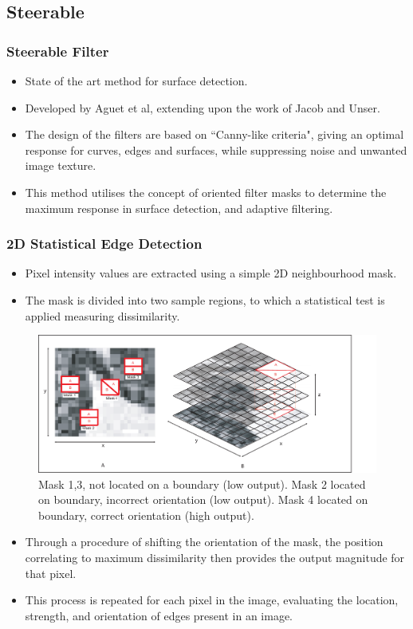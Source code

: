 \documentclass[9pt]{beamer}
\begin{document}
\subsection{Steerable}
\begin{frame}
\frametitle {Steerable Filter}
\begin{itemize}

\item State of the art method for surface detection.
\item Developed by Aguet et al, extending upon the work of Jacob and Unser.
\item The design of the filters are based on ``Canny-like criteria", giving an optimal response for curves, edges and surfaces, while suppressing noise and unwanted image texture.
\item This method utilises the concept of oriented filter masks to determine the maximum response in surface detection, and adaptive filtering.
\end{itemize}
\end{frame}
\begin{frame}[shrink]
\frametitle{ 2D Statistical Edge Detection}
\begin{multicols}{2}
\begin{itemize}
\item Pixel intensity values are extracted using a simple 2D neighbourhood mask. 
\item The mask is divided into two sample regions, to which a statistical test is applied measuring dissimilarity.
 \end{itemize}
 \begin{figure}
\includegraphics[scale=0.35]{2D3Dmasks1}
\caption{ Mask 1,3, not located on a boundary (low output). Mask 2 located on boundary, incorrect orientation (low output). Mask 4 located on boundary, correct orientation (high output).}
 \end{figure}
 \begin{itemize}
 \item Through a procedure of shifting the orientation of the mask, the position correlating to maximum dissimilarity then provides the output magnitude for that pixel.
 \item This process is repeated for each pixel in the image, evaluating the location, strength, and orientation of edges present in an image.
 \end{itemize}

\end{multicols}
 \end{frame}
\end{document}
